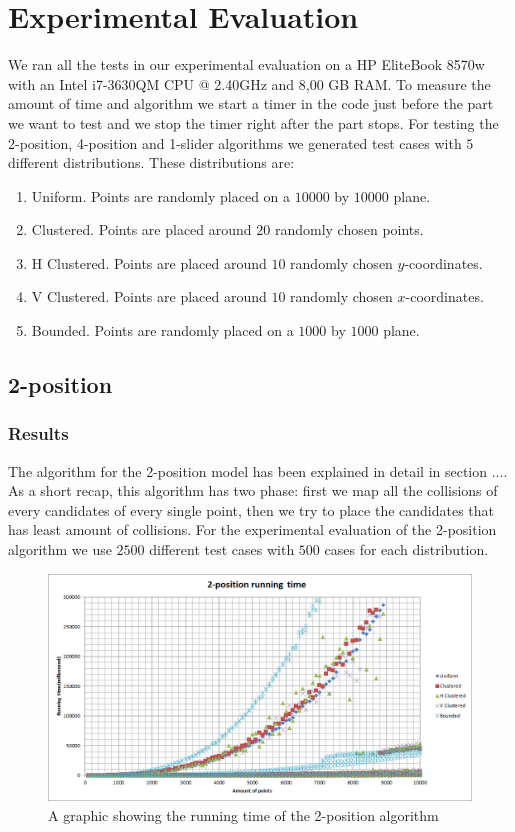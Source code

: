 \documentclass[crop=false,a4paper,oneside,11pt]{standalone}
\begin{document}
\section{Experimental Evaluation}

We ran all the tests in our experimental evaluation on a HP EliteBook 8570w with an Intel i7-3630QM CPU @ 2.40GHz and 8,00 GB RAM. To measure the amount of time and algorithm we start a timer in the code just before the part we want to test and we stop the timer right after the part stops. For testing the 2-position, 4-position and 1-slider algorithms we generated test cases with $5$ different distributions. These distributions are:
\begin{enumerate}
    \item Uniform. Points are randomly placed on a $10000$ by $10000$ plane.
    \item Clustered. Points are placed around $20$ randomly chosen points.
    \item H Clustered. Points are placed around $10$ randomly chosen $y$-coordinates.
    \item V Clustered. Points are placed around $10$ randomly chosen $x$-coordinates.
    \item Bounded. Points are randomly placed on a $1000$ by $1000$ plane.
\end{enumerate}

\subsection{2-position}
\subsubsection{Results}
The algorithm for the 2-position model has been explained in detail in section .... As a short recap, this algorithm has two phase: first we map all the collisions of every candidates of every single point, then we try to place the candidates that has least amount of collisions. For the experimental evaluation of the 2-position algorithm we use $2500$ different test cases with $500$ cases for each distribution.

\begin{figure}[h!]
 \centering
  \centerline{\includegraphics[scale = 0.5]{2PosRunningTime.png}}
  \caption{A graphic showing the running time of the 2-position algorithm}
 \end{figure}
\end{document}
